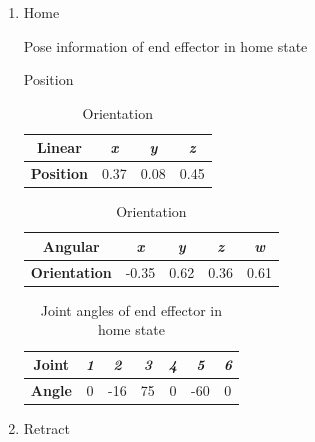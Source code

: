 \documentclass[12pt]{article}
\begin{document}
\begin{enumerate}
        \begin{enumerate}

            \item Home
            
            \begin{table}[H]
                \caption{Pose information of end effector in home state}
                \begin{subtable}{.5\linewidth}
                    \centering
                    \caption{Position}
                    \begin{tabular}{cccc}
                        \toprule
                        \textbf{Linear} & \textit{x} & \textit{y} & \textit{z} \\\midrule
                        \textbf{Position} & 0.37 & 0.08 & 0.45 \\\bottomrule
                    \end{tabular}
                \end{subtable}
                \begin{subtable}{.5\linewidth}
                    \centering
                    \caption{Orientation}
                    \begin{tabular}{ccccc}
                        \toprule
                        \textbf{Angular} & \textit{x} & \textit{y} & \textit{z} & \textit{w} \\\midrule
                        \textbf{Orientation} & -0.35 & 0.62 & 0.36 & 0.61 \\\bottomrule
                    \end{tabular}
                \end{subtable}
            \end{table}
                    
            \begin{table}[H]
                \centering
                \caption{Joint angles of end effector in home state}
                \begin{tabular}{ccccccc}
                \toprule
                \textbf{Joint} & \textit{1} & \textit{2} & \textit{3} & \textit{4} & \textit{5} & \textit{6} \\\midrule
                \textbf{Angle} & 0 & -16 & 75 & 0 & -60 & 0 \\\bottomrule
                \end{tabular}
            \end{table}

            \item Retract
            

\end{enumerate}
\end{enumerate}
\end{document}
